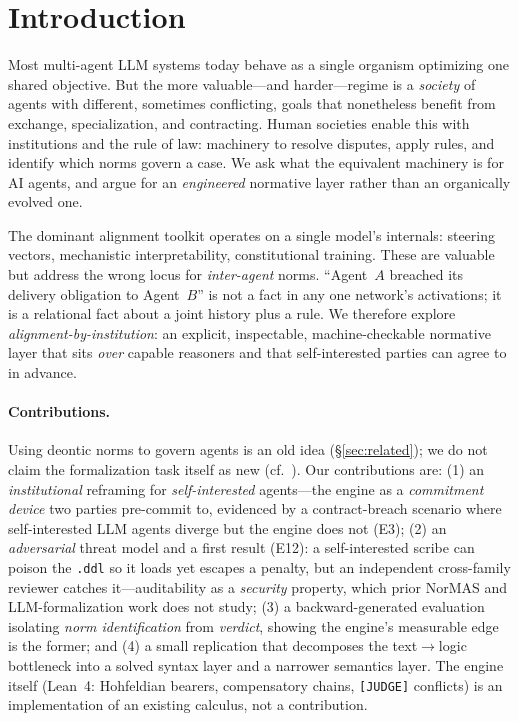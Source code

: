 \section{Introduction}
Most multi-agent LLM systems today behave as a single organism optimizing one
shared objective. But the more valuable---and harder---regime is a \emph{society}
of agents with different, sometimes conflicting, goals that nonetheless benefit
from exchange, specialization, and contracting. Human societies enable this with
institutions and the rule of law: machinery to resolve disputes, apply rules, and
identify which norms govern a case. We ask what the equivalent machinery is for AI
agents, and argue for an \emph{engineered} normative layer rather than an organically
evolved one.

The dominant alignment toolkit operates on a single model's internals: steering
vectors, mechanistic interpretability, constitutional training. These are valuable
but address the wrong locus for \emph{inter-agent} norms. ``Agent~$A$ breached its
delivery obligation to Agent~$B$'' is not a fact in any one network's activations;
it is a relational fact about a joint history plus a rule. We therefore explore
\emph{alignment-by-institution}: an explicit, inspectable, machine-checkable
normative layer that sits \emph{over} capable reasoners and that self-interested
parties can agree to in advance.

\paragraph{Contributions.}
Using deontic norms to govern agents is an old idea (\S\ref{sec:related}); we do not claim the
formalization task itself as new (cf.\ \citet{horner2025robust}). Our contributions are:
(1) an \emph{institutional} reframing for \emph{self-interested} agents---the engine as a
\emph{commitment device} two parties pre-commit to, evidenced by a contract-breach scenario where
self-interested LLM agents diverge but the engine does not (E3); (2) an \emph{adversarial}
threat model and a first result (E12): a self-interested scribe can poison the \texttt{.ddl} so it
loads yet escapes a penalty, but an independent cross-family reviewer catches it---auditability as
a \emph{security} property, which prior NorMAS and LLM-formalization work does not study;
(3) a backward-generated evaluation isolating \emph{norm identification} from \emph{verdict},
showing the engine's measurable edge is the former; and (4) a small replication that decomposes the
text$\rightarrow$logic bottleneck into a solved syntax layer and a narrower semantics layer.
The engine itself (Lean~4: Hohfeldian bearers, compensatory chains, \texttt{[JUDGE]} conflicts)
is an implementation of an existing calculus, not a contribution.


